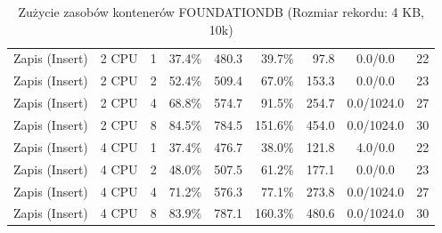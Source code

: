 \begin{table}[ht]
{\begin{tabular}{llcrrrrcc}
Zapis (Insert) & 2 CPU & 1 & 37.4\% & 480.3 & 39.7\% & 97.8 & 0.0/0.0 & 22 \\
Zapis (Insert) & 2 CPU & 2 & 52.4\% & 509.4 & 67.0\% & 153.3 & 0.0/0.0 & 23 \\
Zapis (Insert) & 2 CPU & 4 & 68.8\% & 574.7 & 91.5\% & 254.7 & 0.0/1024.0 & 27 \\
Zapis (Insert) & 2 CPU & 8 & 84.5\% & 784.5 & 151.6\% & 454.0 & 0.0/1024.0 & 30 \\
Zapis (Insert) & 4 CPU & 1 & 37.4\% & 476.7 & 38.0\% & 121.8 & 4.0/0.0 & 22 \\
Zapis (Insert) & 4 CPU & 2 & 48.0\% & 507.5 & 61.2\% & 177.1 & 0.0/0.0 & 23 \\
Zapis (Insert) & 4 CPU & 4 & 71.2\% & 576.3 & 77.1\% & 273.8 & 0.0/1024.0 & 27 \\
Zapis (Insert) & 4 CPU & 8 & 83.9\% & 787.1 & 160.3\% & 480.6 & 0.0/1024.0 & 30 \\
\bottomrule
\end{tabular}%
}
\caption{Zużycie zasobów kontenerów FOUNDATIONDB (Rozmiar rekordu: 4 KB, 10k)}
\label{tab:resources_foundationdb_medium_10000}
\end{table}
